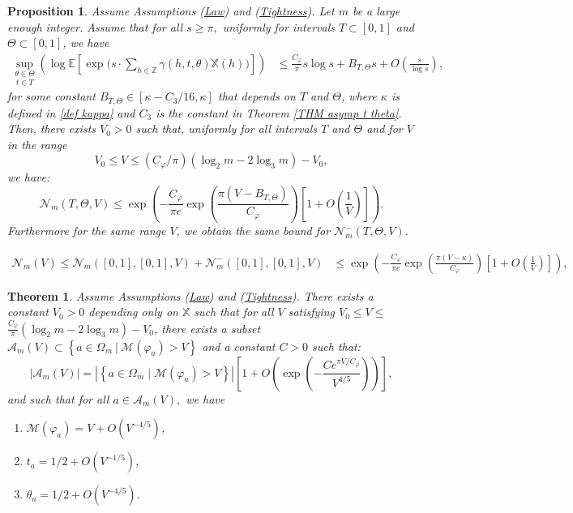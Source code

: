 \documentclass[10pt,a4paper]{amsart}
\newtheorem{thm}{Theorem}
\newtheorem{pro}{Proposition}
\def\A{\mathcal{A}}
\def\E{\mathbb{E}}
\def\M{\mathcal{M}}
\def\Mp{C_\varphi}
\def\Ncal{\mathcal{N}}
\def\X{\mathbb{X}}
\def\Z{\mathbb{Z}}
\begin{document}
\begin{pro}\label{Pro final canonic unif T,Theta} Assume Assumptions (\hyperlink{Ass Law}{Law}) and (\hyperlink{Ass Tightness}{Tightness}). Let $m$ be a large enough integer. Assume that for all $s \geq \pi,$ uniformly for intervals $T\subset[0,1]$ and $\Theta\subset[0,1]$, we have
\begin{align*}
\underset{t\in T}{\sup_{\theta\in\Theta}}
\left(
\log \E \left[\exp \Big(s \cdot \sum_{h \in \Z}
   \gamma(h,t,\theta)\X(h)\Big) \right] \right)
     &\leq  \frac{\Mp}{\pi} s \log s+B_{T,\Theta} s+ O\left(\frac{s}{\log s}\right),
\end{align*}
for some constant $B_{T,\Theta}\in [\kappa- C_3/16,\kappa]$ that depends on $T$ and $\Theta$, where $ \kappa$ is defined in \eqref{def kappa} and $C_3$ is the constant in  Theorem \ref{THM asymp t theta}.
Then, there exists $V_0>0$ such that, uniformly for all intervals $T$ and $\Theta$ and for $V$ in the range $$V_0\leq V \leq (\Mp /\pi)\left(\log_2 m-2\log_3 m\right)-V_0,$$ we have:
\begin{equation}
    \Ncal_m(T,\Theta,V)
    \leq 
\exp\left(- \frac{\Mp}{\pi e} \exp\left(\frac{\pi (V-B_{T,\Theta})}{\Mp}\right)\left[1+O\left(\frac{1}{V}\right)\right] 
\right).
\end{equation}
Furthermore for the same range $V$, we obtain the same bound for $\Ncal_m^-(T,\Theta,V)$.
\end{pro}

\begin{align}\label{eq THM 1.1}
    \Ncal_m(V) \leq \Ncal_m([0,1],[0,1],V)+\Ncal_m^-([0,1],[0,1],V) 
    & \leq \exp\left(- \frac{\Mp}{\pi e} \exp\left(\frac{\pi (V-\kappa)}{\Mp}\right)\left[1
+O\left(\frac{1}{V}\right)\right] 
\right),
\end{align}

\begin{thm}\label{thm structure simp} Assume Assumptions (\hyperlink{Ass Law}{Law}) and (\hyperlink{Ass Tightness}{Tightness}). There exists a constant $ V_0>0$ depending only on $\X$ such that for all \(V\) satisfying $V_0\leq V \leq$
$ \frac{\Mp}{\pi}(\log_2 m-2\log_3 m)-V_0$, there exists a subset $\A_m(V)\subset \left\{
a\in \Omega_m\: \big|\:\M(\varphi_a)> V
\right\}$ and a constant $C>0$ such that:
\[
\left|\A_m(V) \right|= \left|\left\{
a\in \Omega_m\;\big|\;\M(\varphi_a)> V
\right\}\right|
\left[1 +O\left(\exp\left(- 
\frac{Ce^{\pi V/\Mp}}{V^{4/5}}
\right)\right)\right],
\]
and such that for all $ a \in \A_m(V),$ we have
\begin{enumerate}
    \item $\M(\varphi_a)=V+ O\left(V^{-4/5}\right)$,
    \item $t_a = 1/2+ O\left(V^{-1/5}\right)$,
    \item $\theta_a = 1/2+ O\left(V^{-4/5}\right)$.
\end{enumerate}

\end{thm}
\end{document}
